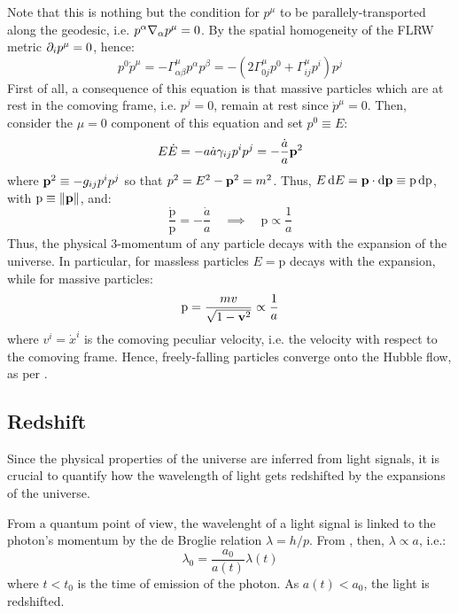 Note that this is nothing but the condition for $ p^\mu $ to be parallely-transported along the geodesic, i.e. $ p^\alpha \nabla_\alpha p^\mu = 0 $. By the spatial homogeneity of the FLRW metric $ \partial_i p^\mu = 0 $, hence:
\begin{equation*}
  p^0 \dot{p}^\mu = - \Gamma^\mu_{\alpha \beta} p^\alpha p^\beta = - \left( 2 \Gamma^\mu_{0j} p^0 + \Gamma^\mu_{ij} p^i \right) p^j
\end{equation*}
First of all, a consequence of this equation is that massive particles which are at rest in the comoving frame, i.e. $ p^j = 0 $, remain at rest since $ \dot{p}^\mu = 0 $. Then, consider the $ \mu = 0 $ component of this equation and set $ p^0 \equiv E $:
\begin{equation*}
  E \dot{E} = - a \dot{a} \gamma_{ij} p^i p^j = - \frac{\dot{a}}{a} \mathbf{p}^2
\end{equation*}
where $ \mathbf{p}^2 \equiv - g_{ij} p^i p^j $ so that $ p^2 = E^2 - \mathbf{p}^2 = m^2 $. Thus, $ E \, \mathrm{d} E = \mathbf{p} \cdot \mathrm{d} \mathbf{p} \equiv \text{p} \, \mathrm{d} \text{p} $, with $ \text{p} \equiv \left\lVert\mathbf{p}\right\rVert $, and:
\begin{equation}
  \frac{\dot{\text{p}}}{\text{p}} = - \frac{\dot{a}}{a}
  \quad \implies \quad
  \text{p} \propto \frac{1}{a}
  \label{eq:geodesic-momentum}
\end{equation}
Thus, the physical 3-momentum of any particle decays with the expansion of the universe. In particular, for massless particles $ E = \text{p} $ decays with the expansion, while for massive particles:
\begin{equation*}
  \text{p} = \frac{m v}{\sqrt{1 - \mathbf{v}^2}} \propto \frac{1}{a}
\end{equation*}
where $ v^i = \dot{x}^i $ is the comoving peculiar velocity, i.e. the velocity with respect to the comoving frame. Hence, freely-falling particles converge onto the Hubble flow, as per .

\subsection{Redshift}

Since the physical properties of the universe are inferred from light signals, it is crucial to quantify how the wavelength of light gets redshifted by the expansions of the universe.

From a quantum point of view, the wavelenght of a light signal is linked to the photon's momentum by the de Broglie relation $ \lambda = h / p $. From , then, $ \lambda \propto a $, i.e.:
\begin{equation}
  \lambda_0 = \frac{a_0}{a(t)} \lambda(t)
  \label{eq:redshift}
\end{equation}
where $ t < t_0 $ is the time of emission of the photon. As $ a(t) < a_0 $, the light is redshifted.

